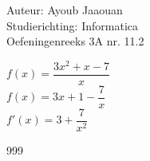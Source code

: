 \documentclass[a4paper]{article}
\begin{document}
\noindent \large Auteur: Ayoub Jaaouan \\
\noindent \large Studierichting: Informatica\\
\noindent \large Oefeningenreeks 3A nr. 11.2\\

\medskip

\normalsize

$f(x) = \dfrac{3x^2+x-7}{x}$ \\

$f(x)  = 3x+1- \dfrac{7}{x}$ \\

$f'(x)  = 3+ \dfrac{7}{x^2}$ \\




\begin{thebibliography}{999}
\end{thebibliography}
\end{document}
